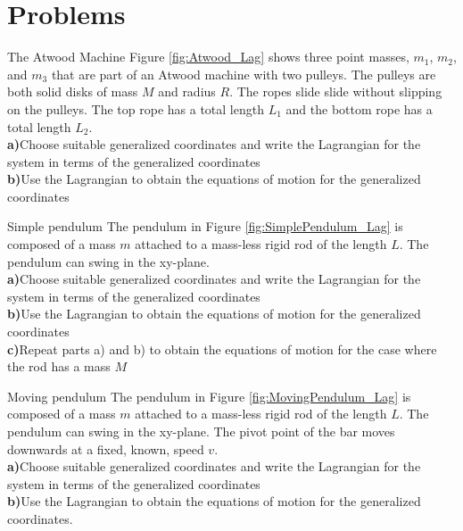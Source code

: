 \section{Problems}

\begin{problem}{The Atwood Machine}
Figure \ref{fig:Atwood_Lag} shows three point masses, $m_1$, $m_2$, and $m_3$ that are part of an Atwood machine with two pulleys. The pulleys are both solid disks of mass $M$ and radius $R$. The ropes slide slide without slipping on the pulleys. The top rope has a total length $L_1$ and the bottom rope has a total length $L_2$.
\\
\textbf{a)}Choose suitable generalized coordinates and write the Lagrangian for the system in terms of the generalized coordinates\\
\textbf{b)}Use the Lagrangian to obtain the equations of motion for the generalized coordinates\\
\label{prob_Lagrange_1}
\end{problem}

\begin{problem}{Simple pendulum}
The pendulum in Figure \ref{fig:SimplePendulum_Lag} is composed of a mass $m$ attached to a mass-less rigid rod of the length $L$. The pendulum can swing in the xy-plane. 
\\
\textbf{a)}Choose suitable generalized coordinates and write the Lagrangian for the system in terms of the generalized coordinates\\
\textbf{b)}Use the Lagrangian to obtain the equations of motion for the generalized coordinates\\
\textbf{c)}Repeat parts a) and b) to obtain the equations of motion for the case where the rod has a mass $M$\\
\label{prob_Lagrange_2}
\end{problem}

\begin{problem}{Moving pendulum}
The pendulum in Figure \ref{fig:MovingPendulum_Lag} is composed of a mass $m$ attached to a mass-less rigid rod of the length $L$. The pendulum can swing in the xy-plane. The pivot point of the bar moves downwards at a fixed, known, speed $v$.
\\
\textbf{a)}Choose suitable generalized coordinates and write the Lagrangian for the system in terms of the generalized coordinates\\
\textbf{b)}Use the Lagrangian to obtain the equations of motion for the generalized coordinates.
\label{prob_Lagrange_3}
\end{problem}


